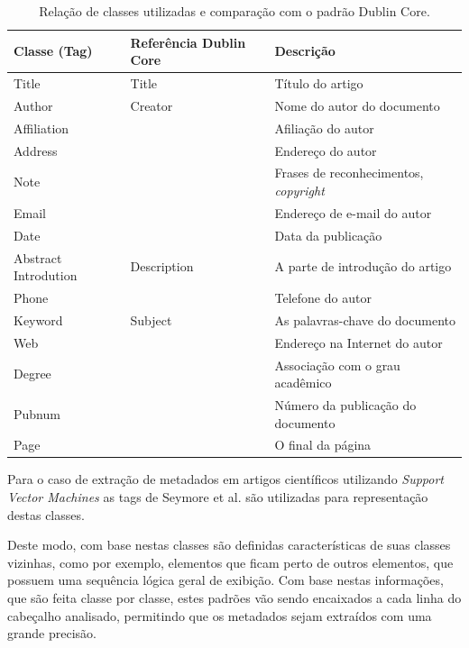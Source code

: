 \documentclass[
	12pt,               %
	openright,          %
	twoside,            %
	a4paper,            %
	english,            %
	brazil              %
	]{abntex2}
\begin{document}
\begin{table}
    \caption{Relação de classes utilizadas e comparação com o padrão Dublin Core.}
    \begin{center}
        \begin{tabular}{|C{3cm}|C{3cm}|p{7cm}|}
            \hline \textbf{Classe (Tag)} & \textbf{Referência Dublin Core} & \textbf{Descrição}\\ 
            \hline Title & Title & Título do artigo\\
            \hline Author & Creator & Nome do autor do documento\\
            \hline Affiliation & & Afiliação do autor\\
            \hline Address & & Endereço do autor\\
            \hline Note & & Frases de reconhecimentos, \textit{copyright}\\
            \hline Email & & Endereço de e-mail do autor\\
            \hline Date & & Data da publicação\\
            \hline Abstract Introdution & Description & A parte de introdução do artigo\\
            \hline Phone & & Telefone do autor\\
            \hline Keyword & Subject & As palavras-chave do documento\\
            \hline Web & & Endereço na Internet do autor\\
            \hline Degree & & Associação com o grau acadêmico\\
            \hline Pubnum & & Número da publicação do documento\\
            \hline Page & & O final da página\\
            \hline
        \end{tabular}
    \end{center}
    \label{tab:svm-classes}
\end{table}

Para o caso de extração de metadados em artigos científicos utilizando \textit{Support Vector Machines} \cite{svm} as tags de Seymore et al. \cite{seymore} são utilizadas para representação destas classes.

Deste modo, com base nestas classes são definidas características de suas classes vizinhas, como por exemplo, elementos que ficam perto de outros elementos, que possuem uma sequência lógica geral de exibição. Com base nestas informações, que são feita classe por classe, estes padrões vão sendo encaixados a cada linha do cabeçalho analisado, permitindo que os metadados sejam extraídos com uma grande precisão.
\end{document}

